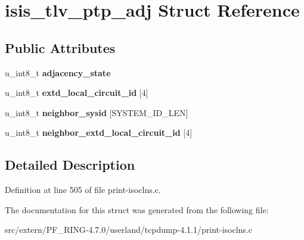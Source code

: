 \hypertarget{structisis__tlv__ptp__adj}{
\section{isis\_\-tlv\_\-ptp\_\-adj Struct Reference}
\label{structisis__tlv__ptp__adj}
}
\subsection*{Public Attributes}
\begin{DoxyCompactItemize}
\item 
\hypertarget{structisis__tlv__ptp__adj_a6500eec2df0eb8399552aeb610cdb915}{
u\_\-int8\_\-t {\bfseries adjacency\_\-state}}
\label{structisis__tlv__ptp__adj_a6500eec2df0eb8399552aeb610cdb915}

\item 
\hypertarget{structisis__tlv__ptp__adj_a7bb8bf0823549c0a17b92e7c080cf0c4}{
u\_\-int8\_\-t {\bfseries extd\_\-local\_\-circuit\_\-id} \mbox{[}4\mbox{]}}
\label{structisis__tlv__ptp__adj_a7bb8bf0823549c0a17b92e7c080cf0c4}

\item 
\hypertarget{structisis__tlv__ptp__adj_a4f4bc2e6482947458051b4affa0c0538}{
u\_\-int8\_\-t {\bfseries neighbor\_\-sysid} \mbox{[}SYSTEM\_\-ID\_\-LEN\mbox{]}}
\label{structisis__tlv__ptp__adj_a4f4bc2e6482947458051b4affa0c0538}

\item 
\hypertarget{structisis__tlv__ptp__adj_a6f421874c2ac0f78b77750b3bedadfac}{
u\_\-int8\_\-t {\bfseries neighbor\_\-extd\_\-local\_\-circuit\_\-id} \mbox{[}4\mbox{]}}
\label{structisis__tlv__ptp__adj_a6f421874c2ac0f78b77750b3bedadfac}

\end{DoxyCompactItemize}


\subsection{Detailed Description}


Definition at line 505 of file print-\/isoclns.c.



The documentation for this struct was generated from the following file:\begin{DoxyCompactItemize}
\item 
src/extern/PF\_\-RING-\/4.7.0/userland/tcpdump-\/4.1.1/print-\/isoclns.c\end{DoxyCompactItemize}

